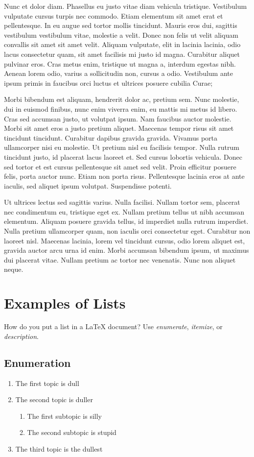 Nunc et dolor diam. Phasellus eu justo vitae diam vehicula tristique. Vestibulum vulputate cursus turpis nec commodo. Etiam elementum sit amet erat et pellentesque. In eu augue sed tortor mollis tincidunt. Mauris eros dui, sagittis vestibulum vestibulum vitae, molestie a velit. Donec non felis ut velit aliquam convallis sit amet sit amet velit. Aliquam vulputate, elit in lacinia lacinia, odio lacus consectetur quam, sit amet facilisis mi justo id magna. Curabitur aliquet pulvinar eros. Cras metus enim, tristique ut magna a, interdum egestas nibh. Aenean lorem odio, varius a sollicitudin non, cursus a odio. Vestibulum ante ipsum primis in faucibus orci luctus et ultrices posuere cubilia Curae;

Morbi bibendum est aliquam, hendrerit dolor ac, pretium sem. Nunc molestie, dui in euismod finibus, nunc enim viverra enim, eu mattis mi metus id libero. Cras sed accumsan justo, ut volutpat ipsum. Nam faucibus auctor molestie. Morbi sit amet eros a justo pretium aliquet. Maecenas tempor risus sit amet tincidunt tincidunt. Curabitur dapibus gravida gravida. Vivamus porta ullamcorper nisi eu molestie. Ut pretium nisl eu facilisis tempor. Nulla rutrum tincidunt justo, id placerat lacus laoreet et. Sed cursus lobortis vehicula. Donec sed tortor et est cursus pellentesque sit amet sed velit. Proin efficitur posuere felis, porta auctor nunc. Etiam non porta risus. Pellentesque lacinia eros at ante iaculis, sed aliquet ipsum volutpat. Suspendisse potenti.

Ut ultrices lectus sed sagittis varius. Nulla facilisi. Nullam tortor sem, placerat nec condimentum eu, tristique eget ex. Nullam pretium tellus ut nibh accumsan elementum. Aliquam posuere gravida tellus, id imperdiet nulla rutrum imperdiet. Nulla pretium ullamcorper quam, non iaculis orci consectetur eget. Curabitur non laoreet nisl. Maecenas lacinia, lorem vel tincidunt cursus, odio lorem aliquet est, gravida auctor arcu urna id enim. Morbi accumsan bibendum ipsum, ut maximus dui placerat vitae. Nullam pretium ac tortor nec venenatis. Nunc non aliquet neque. 

\section{Examples of Lists}

How do you put a list in a \LaTeX{} document? Use \emph{enumerate}, \emph{itemize}, or \emph{description}.

\subsection*{Enumeration}
\begin{enumerate}
\item The first topic is dull
\item The second topic is duller
\begin{enumerate}
\item The first subtopic is silly
\item The second subtopic is stupid
\end{enumerate}
\item The third topic is the dullest
\end{enumerate}

